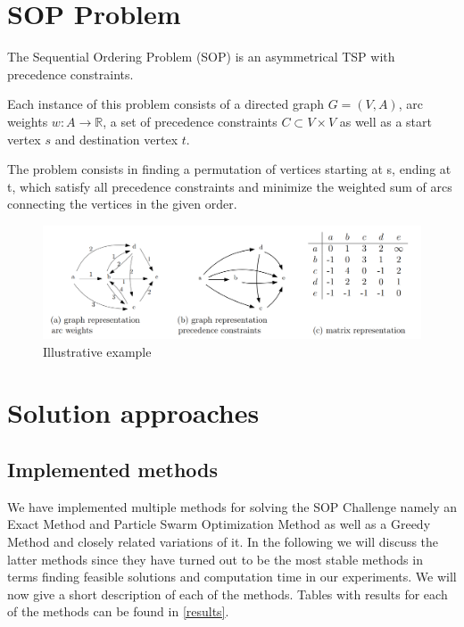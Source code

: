 \documentclass[]{article}
\begin{document}
    \maketitle
    \tableofcontents



    \section{SOP Problem}

    The Sequential Ordering Problem (SOP) is an asymmetrical TSP with precedence constraints. 

    Each instance of this problem consists of a directed graph $G=(V, A)$, arc weights $w: A \rightarrow \mathbb{R}$, a set of precedence constraints $C \subset V \times V$ as well as a start vertex $s$ and destination vertex $t$.

    The problem consists in finding a permutation of vertices starting at s, ending at t, which satisfy all precedence constraints and minimize the weighted sum of arcs connecting the vertices in the given order. \cite{libralesso2019tree}

    \begin{figure}[hbt]
    	\includegraphics[width=\textwidth]{files/graphic_sop_prob.png}
    	\centering
    	\caption{Illustrative example \cite{libralesso2019tree}}
    \end{figure}



    \section{Solution approaches}

    \subsection{Implemented methods}

    We have implemented multiple methods for solving the SOP Challenge namely an Exact Method and Particle Swarm Optimization Method as well as a 
    Greedy Method and closely related variations of it. In the following we will discuss the latter methods since they have turned out to be the most 
    stable methods in terms finding feasible solutions and computation time in our experiments. We will now give a short description of each of the 
    methods. Tables with results for each of the methods can be found in \ref{results}.
    
\end{document}

